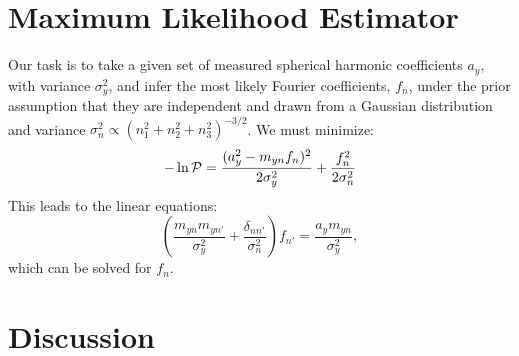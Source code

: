 \documentclass[12pt]{article}
\begin{document}
\section{Maximum Likelihood Estimator}
Our task is to take a given set of measured spherical harmonic coefficients $a_y$, with variance $\sigma_y^2$, and infer the most likely Fourier coefficients, $f_n$, under the prior assumption that they are independent and drawn from a Gaussian distribution and variance $\sigma_n^2\propto(n_1^2+n_2^2+n_3^2)^{-3/2}$. We must minimize:
\begin{equation}
-\ln{\cal P}=\frac{(a_y^2-m_{yn}f_n)^2}{2\sigma_y^2}+\frac{f_n^2}{2\sigma_n^2}
\end{equation}
This leads to the linear equations:
\begin{equation}
\left(\frac{m_{yn}m_{yn'}}{\sigma_y^2}+\frac{\delta_{nn'}}{\sigma_n^2}\right)f_{n'}=\frac{a_ym_{yn}}{\sigma_y^2},
\end{equation}
which can be solved for $f_n$.

\section{Discussion}
\end{document}
